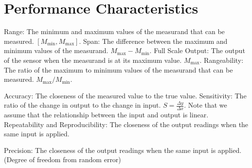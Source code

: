 \documentclass{report}
\begin{document}
\section{Performance Characteristics}

\begin{itemize}
	\ii Range: The minimum and maximum values of the measurand that can be measured. $[M_{\text{min}}, M_{\text{max}}]$.
	\ii Span: The difference between the maximum and minimum values of the measurand. $M_{\text{max}} - M_{\text{min}}$.
	\ii Full Scale Output: The output of the sensor when the measurand is at its maximum value. $M_{\text{max}}$.
	\ii Rangeability: The ratio of the maximum to minimum values of the measurand that can be measured. $M_{\text{max}} / M_{\text{min}}$.
\end{itemize}

\newpage

\begin{figure}[H]
	\centering
\end{figure}

\begin{itemize}
	\ii Accuracy: The closeness of the measured value to the true value.
	\ii Sensitivity: The ratio of the change in output to the change in input. $S = \frac{\Delta y}{\Delta x}$. Note that we assume that the relationship between the input and output is linear.
	\ii Repeatability and Reproducibility: The closeness of the output readings when the same input is applied.
	\begin{itemize}
		\ii Precision: The closeness of the output readings when the same input is applied. (Degree of freedom from random error)
	\end{itemize}
\end{itemize}
\end{document}
